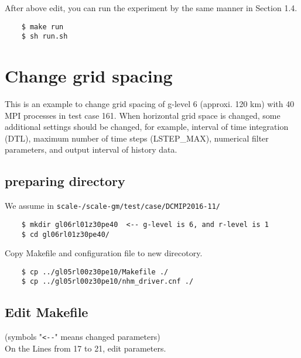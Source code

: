 \noindent After above edit, you can run the experiment
 by the same manner in Section 1.4.
 \begin{verbatim}
    $ make run
    $ sh run.sh
 \end{verbatim}


\section{Change grid spacing}
 \noindent This is an example to change grid spacing of g-level 6
 (approxi. 120 km) with 40 MPI processes in test case 161.
 When horizontal grid space is changed, some additional settings
 should be changed, for example, interval of time integration (DTL),
 maximum number of time steps (LSTEP\_MAX), numerical filter parameters,
 and output interval of history data.

\subsection{preparing directory}
 We assume in \texttt{scale-{\version}/scale-gm/test/case/DCMIP2016-11/}
 \begin{verbatim}
    $ mkdir gl06rl01z30pe40  <-- g-level is 6, and r-level is 1
    $ cd gl06rl01z30pe40/
 \end{verbatim}

 \noindent Copy Makefile and configuration file to new direcotory.
 \begin{verbatim}
    $ cp ../gl05rl00z30pe10/Makefile ./
    $ cp ../gl05rl00z30pe10/nhm_driver.cnf ./
 \end{verbatim}

\subsection{Edit Makefile}
 (symbols "\verb|<--|" means changed parameters) \\
 On the Lines from 17 to 21, edit parameters.

